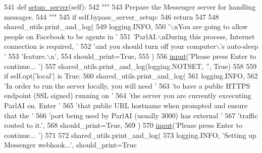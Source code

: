 \begin{DoxyCode}
541     \textcolor{keyword}{def }\hyperlink{namespaceparlai_1_1chat__service_1_1services_1_1messenger_1_1server__utils_afb56b04206cd0f42384438f1ac6d9cda}{setup\_server}(self):
542         \textcolor{stringliteral}{"""}
543 \textcolor{stringliteral}{        Prepare the Messenger server for handling messages.}
544 \textcolor{stringliteral}{        """}
545         \textcolor{keywordflow}{if} self.bypass\_server\_setup:
546             \textcolor{keywordflow}{return}
547 
548         shared\_utils.print\_and\_log(
549             logging.INFO,
550             \textcolor{stringliteral}{'\(\backslash\)nYou are going to allow people on Facebook to be agents in '}
551             \textcolor{stringliteral}{'ParlAI.\(\backslash\)nDuring this process, Internet connection is required, '}
552             \textcolor{stringliteral}{'and you should turn off your computer\(\backslash\)'s auto-sleep '}
553             \textcolor{stringliteral}{'feature.\(\backslash\)n'},
554             should\_print=\textcolor{keyword}{True},
555         )
556         \hyperlink{namespaceparlai_1_1mturk_1_1core_1_1dev_1_1test_1_1test__full__system_a1e1817cd65688fb90f827834d1fb4567}{input}(\textcolor{stringliteral}{'Please press Enter to continue... '})
557         shared\_utils.print\_and\_log(logging.NOTSET, \textcolor{stringliteral}{''}, \textcolor{keyword}{True})
558 
559         \textcolor{keywordflow}{if} self.opt[\textcolor{stringliteral}{'local'}] \textcolor{keywordflow}{is} \textcolor{keyword}{True}:
560             shared\_utils.print\_and\_log(
561                 logging.INFO,
562                 \textcolor{stringliteral}{'In order to run the server locally, you will need '}
563                 \textcolor{stringliteral}{'to have a public HTTPS endpoint (SSL signed) running on '}
564                 \textcolor{stringliteral}{'the server you are currently excecuting ParlAI on. Enter '}
565                 \textcolor{stringliteral}{'that public URL hostname when prompted and ensure that the '}
566                 \textcolor{stringliteral}{'port being used by ParlAI (usually 3000) has external '}
567                 \textcolor{stringliteral}{'traffic routed to it.'},
568                 should\_print=\textcolor{keyword}{True},
569             )
570             \hyperlink{namespaceparlai_1_1mturk_1_1core_1_1dev_1_1test_1_1test__full__system_a1e1817cd65688fb90f827834d1fb4567}{input}(\textcolor{stringliteral}{'Please press Enter to continue... '})
571 
572         shared\_utils.print\_and\_log(
573             logging.INFO, \textcolor{stringliteral}{'Setting up Messenger webhook...'}, should\_print=\textcolor{keyword}{True}

\end{DoxyCode}
